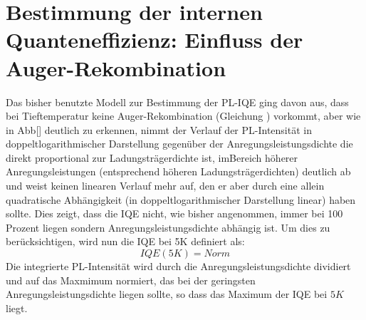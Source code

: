 \section{Bestimmung der internen Quanteneffizienz: Einfluss der Auger-Rekombination}


Das bisher benutzte Modell zur Bestimmung der PL-IQE ging davon aus, dass bei Tieftemperatur keine Auger-Rekombination (Gleichung ) vorkommt, aber wie in Abb[] deutlich zu erkennen, nimmt der Verlauf der PL-Intensität in doppeltlogarithmischer Darstellung gegenüber der Anregungsleistungsdichte die direkt proportional zur Ladungsträgerdichte ist, imBereich höherer Anregungsleistungen (entsprechend höheren Ladungsträgerdichten) deutlich ab und weist keinen linearen Verlauf mehr auf, den er aber durch eine allein quadratische Abhängigkeit (in doppeltlogarithmischer Darstellung linear) haben sollte. Dies zeigt,
dass die IQE nicht, wie bisher angenommen, immer bei 100 Prozent liegen sondern Anregungsleistungsdichte abhängig ist. Um dies zu berücksichtigen, wird nun die IQE bei 5K definiert als:
\begin{equation}
    IQE(5K) = Norm
\end{equation}
Die integrierte PL-Intensität wird durch die Anregungsleistungsdichte dividiert und auf das Maxmimum normiert, das bei der geringsten Anregungsleistungsdichte liegen sollte, so dass das Maximum der IQE bei $5K$ liegt. 

%
